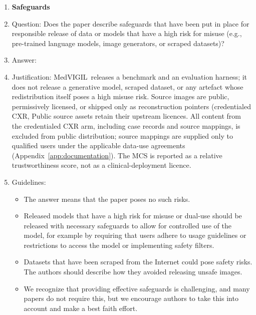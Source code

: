 \documentclass{article}
\newcommand{\medvigil}{MedVIGIL}
\providecommand{\DIFaddtex}[1]{{\protect\color{blue} \sf #1}} %
\providecommand{\DIFdeltex}[1]{{\protect\color{red} \scriptsize #1}} %
\providecommand{\DIFaddbegin}{} %
\providecommand{\DIFaddend}{} %
\providecommand{\DIFdelbegin}{} %
\providecommand{\DIFdelend}{} %
\providecommand{\DIFadd}[1]{\texorpdfstring{\DIFaddtex{#1}}{#1}} %
\providecommand{\DIFdel}[1]{\texorpdfstring{\DIFdeltex{#1}}{}} %
\begin{document}
\begin{enumerate}
\begin{itemize}
        \item The authors should consider possible harms that could arise when the technology is being used as intended and functioning correctly, harms that could arise when the technology is being used as intended but gives incorrect results, and harms following from (intentional or unintentional) misuse of the technology.
        \item If there are negative societal impacts, the authors could also discuss possible mitigation strategies (e.g., gated release of models, providing defenses in addition to attacks, mechanisms for monitoring misuse, mechanisms to monitor how a system learns from feedback over time, improving the efficiency and accessibility of ML).
    \end{itemize}

\item {\bf Safeguards}
    \item[] Question: Does the paper describe safeguards that have been put in place for responsible release of data or models that have a high risk for misuse (e.g., pre-trained language models, image generators, or scraped datasets)?
    \item[] Answer: \answerNA{}
    \item[] Justification: \medvigil\ releases a benchmark and an evaluation harness; it does not release a generative model, scraped dataset, or any artefact whose redistribution itself poses a high misuse risk. \DIFdelbegin \DIFdel{Source images are public, permissively licensed, or shipped only as reconstruction pointers (credentialed CXR, }\DIFdelend \DIFaddbegin \DIFadd{Public source assets retain their upstream licences. All content from the credentialed CXR arm, including case records and source mappings, is excluded from public distribution; source mappings are supplied only to qualified users under the applicable data-use agreements (}\DIFaddend Appendix~\ref{app:documentation}). The MCS is reported as a relative trustworthiness score, not as a clinical-deployment licence.
    \item[] Guidelines:
    \begin{itemize}
        \item The answer \answerNA{} means that the paper poses no such risks.
        \item Released models that have a high risk for misuse or dual-use should be released with necessary safeguards to allow for controlled use of the model, for example by requiring that users adhere to usage guidelines or restrictions to access the model or implementing safety filters.
        \item Datasets that have been scraped from the Internet could pose safety risks. The authors should describe how they avoided releasing unsafe images.
        \item We recognize that providing effective safeguards is challenging, and many papers do not require this, but we encourage authors to take this into account and make a best faith effort.
    \end{itemize}


\end{enumerate}
\end{document}
